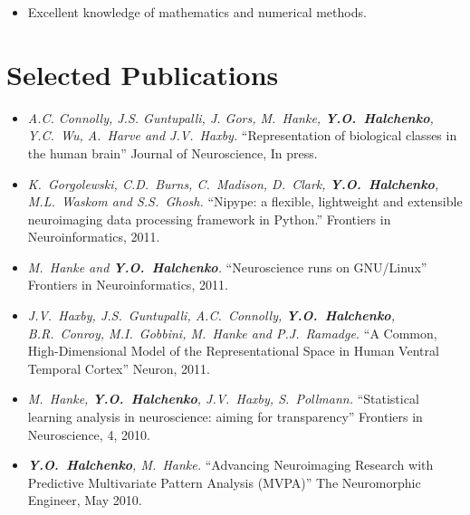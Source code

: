 \documentclass[12pt,overlapped,line]{res}
\newcommand{\mtitle}[1]{``#1''}
\newcommand{\mauthors}[1]{ \textit{#1.}}
\newcommand{\mwhere}[1]{#1.}
\begin{document}
\begin{resume}
\begin{description}[parsep=0.2em,leftmargin=1em]
\begin{itemize}
      \item Excellent knowledge of mathematics and numerical methods.

      \end{itemize}

  \end{description}

 \section{Selected Publications}

 \begin{itemize}

 \item
   \mauthors{A.C.  Connolly, J.S.  Guntupalli, J. Gors, M.~Hanke,
     \textbf{Y.O.~Halchenko}, Y.C.~Wu, A.~Harve and J.V.~Haxby}
   \mtitle{Representation of biological classes in the human brain}
   \mwhere{Journal of Neuroscience, In press}

 \item
   \mauthors{K.~Gorgolewski, C.D.~Burns, C.~Madison, D.~Clark, \textbf{Y.O.~Halchenko},
     M.L.~Waskom and S.S.~Ghosh}
   \mtitle{Nipype: a flexible, lightweight and extensible neuroimaging data processing framework in Python.}
   \mwhere{Frontiers in Neuroinformatics, 2011}


 \item
   \mauthors{M.~Hanke and \textbf{Y.O.~Halchenko}}
   \mtitle{Neuroscience runs on {GNU/Linux}}
   \mwhere{Frontiers in Neuroinformatics, 2011}

 \item
   \mauthors{J.V.~Haxby, J.S.~Guntupalli, A.C.~Connolly,
     \textbf{Y.O.~Halchenko}, B.R.~Conroy, M.I.~Gobbini, M.~Hanke and
     P.J.~Ramadge}
   \mtitle{A Common, High-Dimensional Model of the Representational
     Space in Human Ventral Temporal Cortex}
   \mwhere{Neuron, 2011}

 \item
   \mauthors{M.~Hanke, \textbf{Y.O.~Halchenko}, J.V.~Haxby, S.~Pollmann}
   \mtitle{Statistical learning analysis in neuroscience: aiming for
     transparency}
   \mwhere{Frontiers in Neuroscience, 4, 2010}

 \item
   \mauthors{\textbf{Y.O.~Halchenko}, M.~Hanke}
    \mtitle{Advancing Neuroimaging Research with Predictive Multivariate
      Pattern Analysis (MVPA)}
    \mwhere{The Neuromorphic Engineer, May 2010}


\end{itemize}
\end{resume}
\end{document}
